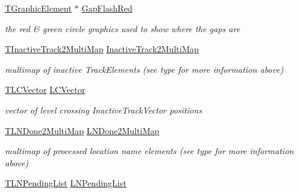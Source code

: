 \begin{DoxyCompactItemize}
\mbox{\label{class_t_track_a5937a66571d1359c961df2b2f4bc53f4}} 
\mbox{\hyperlink{class_t_graphic_element}{T\+Graphic\+Element}} $\ast$ \mbox{\hyperlink{class_t_track_a5937a66571d1359c961df2b2f4bc53f4}{Gap\+Flash\+Red}}
\begin{DoxyCompactList}\small\item\em the red \& green circle graphics used to show where the gaps are \end{DoxyCompactList}\item 
\mbox{\label{class_t_track_add05819a2f4fc2c2e86d376f78c42493}} 
\mbox{\hyperlink{class_t_track_ab54f3c0560218084f75c55ff87409417}{T\+Inactive\+Track2\+Multi\+Map}} \mbox{\hyperlink{class_t_track_add05819a2f4fc2c2e86d376f78c42493}{Inactive\+Track2\+Multi\+Map}}
\begin{DoxyCompactList}\small\item\em multimap of inactive Track\+Elements (see type for more information above) \end{DoxyCompactList}\item 
\mbox{\label{class_t_track_a15d22ee7fd5080ec731666721cacfca1}} 
\mbox{\hyperlink{class_t_track_a84634d4f5d5ce1928526e8be27e74a72}{T\+L\+C\+Vector}} \mbox{\hyperlink{class_t_track_a15d22ee7fd5080ec731666721cacfca1}{L\+C\+Vector}}
\begin{DoxyCompactList}\small\item\em vector of level crossing Inactive\+Track\+Vector positions \end{DoxyCompactList}\item 
\mbox{\label{class_t_track_a499d1662af74f0fc6bded3f35acae2d6}} 
\mbox{\hyperlink{class_t_track_a3005ddcbe9fd2a56040a8a66e6dc0b61}{T\+L\+N\+Done2\+Multi\+Map}} \mbox{\hyperlink{class_t_track_a499d1662af74f0fc6bded3f35acae2d6}{L\+N\+Done2\+Multi\+Map}}
\begin{DoxyCompactList}\small\item\em multimap of processed location name elements (see type for more information above) \end{DoxyCompactList}\item 
\mbox{\label{class_t_track_a730140b44a32bb3f92d6012155432efc}} 
\mbox{\hyperlink{class_t_track_a4f32231e16e5bdb3485a8f2d51cf27f6}{T\+L\+N\+Pending\+List}} \mbox{\hyperlink{class_t_track_a730140b44a32bb3f92d6012155432efc}{L\+N\+Pending\+List}}

\end{DoxyCompactItemize}
